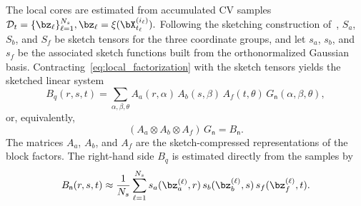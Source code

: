 \documentclass[a4paper,fleqn]{cas-sc}
\theoremstyle{definition}
\begin{document}
The local cores are estimated from accumulated CV samples
$
\mathcal D_t=\{\bz_\ell\}_{\ell=1}^{N_s},
\bz_\ell=\xi(\bX_{t_\ell}^{(i_\ell)}).
$
Following the sketching construction of~\cite{tang2024solving},
$S_a$, $S_b$, and $S_f$ be sketch tensors for the three coordinate groups, and let
$s_a$, $s_b$, and $s_f$ be the associated sketch functions built from the orthonormalized Gaussian basis.
Contracting~\eqref{eq:local_factorization} with the sketch tensors yields the sketched linear system
\begin{equation}
    B_q(r,s,t)
    =
    \sum_{\alpha,\beta,\theta}
    A_a(r,\alpha)\,
    A_b(s,\beta)\,
    A_f(t,\theta)\,
    G_{\mathsf n}(\alpha,\beta,\theta),
    \label{eq:sketched_tensor_system}
\end{equation}
or, equivalently,
\begin{equation}
    (A_a\otimes A_b\otimes A_f)\,G_{\mathsf n} = B_{\mathsf n}.
    \label{eq:sketched_system}
\end{equation}
The matrices $A_a$, $A_b$, and $A_f$ are the sketch-compressed representations of the block factors. The right-hand side $B_q$ is estimated directly from the samples by
\begin{equation}
    B_{\mathsf n}(r,s,t)
    \approx
    \frac{1}{N_s}\sum_{\ell=1}^{N_s}
    s_a(\bz^{(\ell)}_a,r)\,
    s_b(\bz^{(\ell)}_b,s)\,
    s_f(\bz^{(\ell)}_f,t).
    \label{eq:Bq_empirical}
\end{equation}
\end{document}
